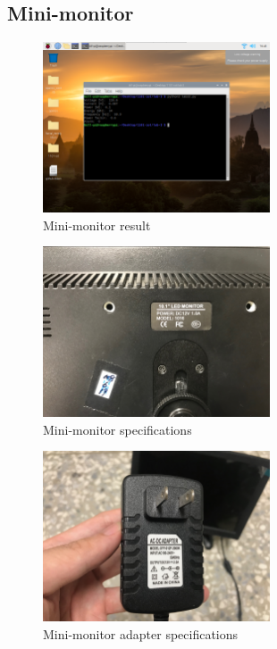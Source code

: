\documentclass[12pt, a4paper, onside]{article}
\begin{document}
\clearpage

\subsection{Mini-monitor}
\begin{figure}[h]
  \centering
  \includegraphics[width=0.6\textwidth]{img/8_res_minimonitor}
  \caption{Mini-monitor result}
\end{figure}
\begin{figure}[h]
  \centering
  \includegraphics[width=0.6\textwidth]{img/8_spe_minimonitor}
  \caption{Mini-monitor specifications}
\end{figure}
\begin{figure}[h]
  \centering
  \includegraphics[width=0.6\textwidth]{img/8_spe_minimonitor_adapter}
  \caption{Mini-monitor adapter specifications}
\end{figure}
\end{document}
